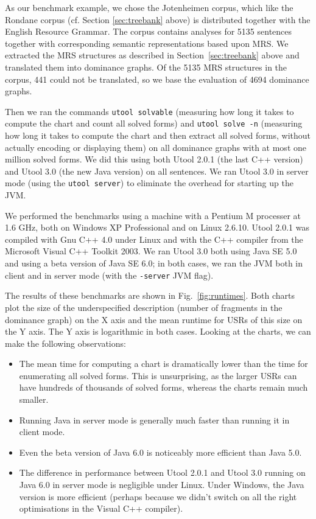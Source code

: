 As our benchmark example, we chose the Jotenheimen corpus, which like the Rondane corpus (cf. Section \ref{sec:treebank} above) is distributed together with the English Resource Grammar. The corpus contains analyses for 5135 sentences together with corresponding semantic representations based upon MRS. We extracted the MRS
structures as described in Section~\ref{sec:treebank} above and translated them into dominance graphs. Of the 5135 MRS structures in the corpus, 441 could not be translated, so we base the evaluation of 4694 dominance graphs.

Then we ran the commands
\verb?utool solvable? (measuring how long it takes to compute the
chart and count all solved forms) and \verb?utool solve -n? (measuring
how long it takes to compute the chart and then extract all solved
forms, without actually encoding or displaying them) on all dominance graphs with at most one million solved forms. We did this
using both Utool 2.0.1 (the last C++ version) and Utool 3.0 (the new
Java version) on all sentences. We ran Utool 3.0 in server mode (using
the \verb?utool server?) to eliminate the overhead for starting up the
JVM.

We performed the benchmarks using a machine with a Pentium M processer
at 1.6 GHz, both on Windows XP Professional and on Linux 2.6.10. Utool
2.0.1 was compiled with Gnu C++ 4.0 under Linux and with the C++
compiler from the Microsoft Visual C++ Toolkit 2003. We ran Utool 3.0
both using Java SE 5.0 and using a beta version of Java SE 6.0; in
both cases, we ran the JVM both in client and in server mode (with the
\verb?-server? JVM flag).

The results of these benchmarks are shown in
Fig.~\ref{fig:runtimes}. Both charts plot the size of the
underspecified description (number of fragments in the dominance
graph) on the X axis and the mean runtime for USRs of this size on the
Y axis. The Y axis is logarithmic in both cases. Looking at the
charts, we can make the following observations:
\begin{itemize}
\item The mean time for computing a chart is dramatically lower than
the time for enumerating all solved forms. This is unsurprising, as
the larger USRs can have hundreds of thousands of solved forms,
whereas the charts remain much smaller.
\item Running Java in server mode is generally much faster than
running it in client mode.
\item Even the beta version of Java 6.0 is noticeably more efficient
than Java 5.0.
\item The difference in performance between Utool 2.0.1 and Utool 3.0
running on Java 6.0 in server mode is negligible under Linux. Under
Windows, the Java version is more efficient (perhaps because we didn't
switch on all the right optimisations in the Visual C++ compiler).
\end{itemize}



